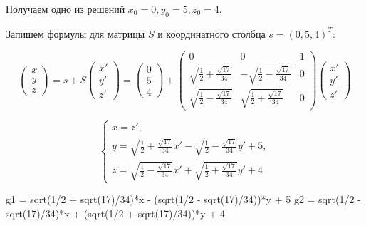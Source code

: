 Получаем одно из решений $x_0 = 0, y_0 = 5, z_0 = 4$.

Запишем формулы для матрицы $S$ и координатного столбца
$s = (0, 5, 4)^{T}$:

\begin{center}
	\begin{equation*}
	\begin{pmatrix}
	  x \\
	  y \\
	  z
	\end{pmatrix} = s + S
	\begin{pmatrix}
	  x' \\
	  y' \\
	  z'
	\end{pmatrix} = 
	\begin{pmatrix}
	  0 \\
	  5 \\
	  4
	\end{pmatrix} + 
	\begin{pmatrix}
	  0 & 0 & 1\\
	  \sqrt{\frac{1}{2}+\frac{\sqrt{17}}{34}} & -\sqrt{\frac{1}{2}-\frac{\sqrt{17}}{34}} & 0\\
	  \sqrt{\frac{1}{2}-\frac{\sqrt{17}}{34}} & \sqrt{\frac{1}{2}+\frac{\sqrt{17}}{34}} & 0
	\end{pmatrix}
	\begin{pmatrix}
	  x' \\
	  y' \\
	  z'
	\end{pmatrix}
	\end{equation*}
\end{center}

\begin{equation*}
 \begin{cases}
   x = z',
   \\
   y = \sqrt{\frac{1}{2}+\frac{\sqrt{17}}{34}}x' - \sqrt{\frac{1}{2}-\frac{\sqrt{17}}{34}}y' + 5,
   \\
   z = \sqrt{\frac{1}{2}-\frac{\sqrt{17}}{34}}x' + \sqrt{\frac{1}{2}+\frac{\sqrt{17}}{34}}y' + 4
 \end{cases}
\end{equation*}

\begin{sagesilent}
g1 = sqrt(1/2 + sqrt(17)/34)*x - (sqrt(1/2 - sqrt(17)/34))*y + 5
g2 = sqrt(1/2 - sqrt(17)/34)*x + (sqrt(1/2 + sqrt(17)/34))*y + 4
\end{sagesilent}

\begin{center}
\end{center}